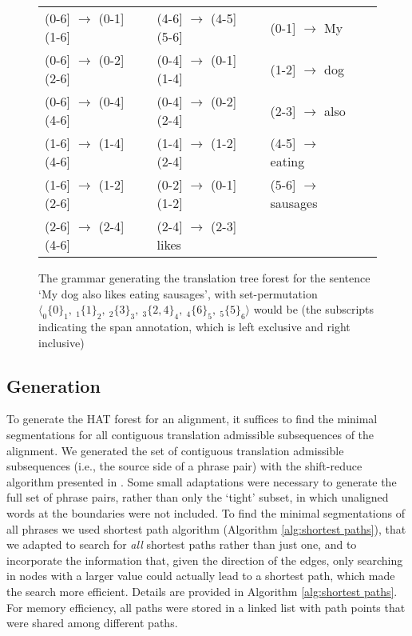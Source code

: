 \begin{figure}\begin{framed}
\small{
\begin{tabular}{llllll}
(0-6] $\rightarrow$ (0-1]  (1-6] && (4-6] $\rightarrow$ (4-5]  (5-6] && (0-1] $\rightarrow$ My\\
(0-6] $\rightarrow$ (0-2]  (2-6] && (0-4] $\rightarrow$ (0-1]  (1-4] && (1-2] $\rightarrow$ dog\\
(0-6] $\rightarrow$ (0-4]  (4-6] && (0-4] $\rightarrow$ (0-2]  (2-4] && (2-3] $\rightarrow$ also\\
(1-6] $\rightarrow$ (1-4]  (4-6] && (1-4] $\rightarrow$ (1-2]  (2-4] && (4-5] $\rightarrow$ eating\\
(1-6] $\rightarrow$ (1-2]  (2-6] && (0-2] $\rightarrow$ (0-1]  (1-2] && (5-6] $\rightarrow$ sausages\\
(2-6] $\rightarrow$ (2-4]  (4-6] && (2-4] $\rightarrow$ (2-3] likes\\
\end{tabular}
\caption{The grammar generating the translation tree forest for the sentence
`My dog also likes eating sausages', with set-permutation $\langle _0\{0\}_1,~ _1\{1\}_2,~ _2\{3\}_3,~ _3\{2,4\}_4, ~_4\{6\}_5,~ _5\{5\}_6\rangle$ would be (the subscripts indicating the span annotation, which is left exclusive and right inclusive)}\label{fig:grammar}
}
\end{framed}
\end{figure}

\subsection{Generation}
To generate the HAT forest for an alignment, it suffices to find the minimal segmentations for all contiguous translation admissible subsequences of the alignment. We generated the set of contiguous translation admissible subsequences (i.e., the source side of a phrase pair) with the shift-reduce algorithm presented in \cite{zhang2008extracting}. Some small adaptations were necessary to generate the full set of phrase pairs, rather than only the `tight' subset, in which unaligned words at the boundaries were not included. To find the minimal segmentations of all phrases we used  shortest path algorithm (Algorithm \ref{alg:shortest paths}), that we adapted to search for \textit{all} shortest paths rather than just one, and to incorporate the information that, given the direction of the edges, only searching in nodes with a larger value could actually lead to a shortest path, which made the search more efficient. Details are provided in Algorithm \ref{alg:shortest paths}. For memory efficiency, all paths were stored in a linked list with path points that were shared among different paths.

